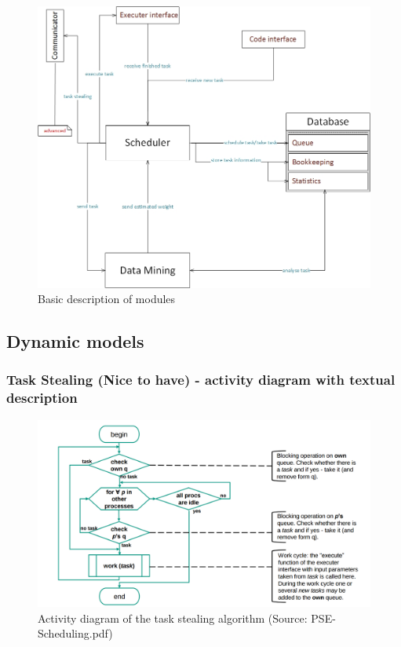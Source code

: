 \vspace{1cm}
\begin{figure}[H]
	\includegraphics[width=.9\textwidth,height=.9\textheight,keepaspectratio]	{images/modules.jpg}
	\caption{Basic description of modules}
\end{figure}
\newpage

\subsection{Dynamic models}
\subsubsection{Task Stealing (Nice to have) - activity diagram with textual description}
\vspace{1.5cm}
\begin{figure}[H]
	\includegraphics[width=15cm]{images/task_stealing_pap.jpg}
	\caption{Activity diagram of the task stealing algorithm (Source: PSE-Scheduling.pdf)}
\end{figure}

